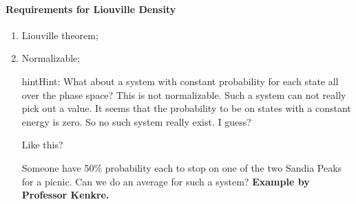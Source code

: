 \documentclass[letterpaper,10pt,english]{sphinxmanual}
\begin{document}
\paragraph{Requirements for Liouville Density}
\label{equilibrium/week4:requirements-for-liouville-density}\begin{enumerate}
\item {} 
Liouville theorem;

\item {} 
Normalizable;

\begin{notice}{hint}{Hint:}
What about a system with constant probability for each state all over the phase space? This is not normalizable. Such a system can not really pick out a value. It seems that the probability to be on states with a constant energy is zero. So no such system really exist. I guess?

Like this?

{\hfill{}\hfill}

Someone have 50\% probability each to stop on one of the two Sandia Peaks for a picnic. Can we do an average for such a system? \textbf{Example by Professor Kenkre.}
\end{notice}

\end{enumerate}
\end{document}
